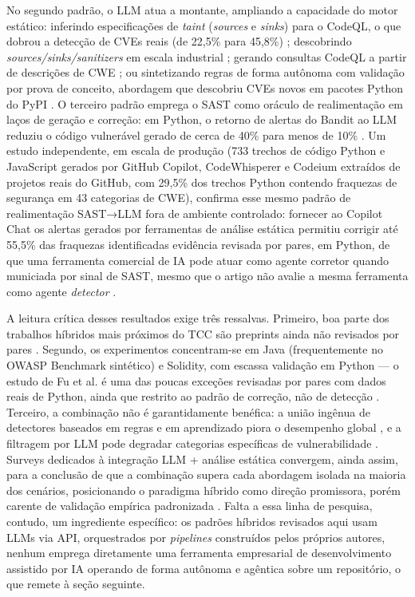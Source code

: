No segundo padrão, o LLM atua a montante, ampliando a capacidade do motor estático: inferindo especificações de \textit{taint} (\textit{sources} e \textit{sinks}) para o CodeQL, o que dobrou a detecção de CVEs reais (de 22,5\% para 45,8\%) \cite{Li2025IRIS}; descobrindo \textit{sources/sinks/sanitizers} em escala industrial \cite{Luo2025SASTLLMDFA}; gerando consultas CodeQL a partir de descrições de CWE \cite{Wang2026CQLLM}; ou sintetizando regras de forma autônoma com validação por prova de conceito, abordagem que descobriu CVEs novos em pacotes Python do PyPI \cite{Tsigkourakos2026QRS}. O terceiro padrão emprega o SAST como oráculo de realimentação em laços de geração e correção: em Python, o retorno de alertas do Bandit ao LLM reduziu o código vulnerável gerado de cerca de 40\% para menos de 10\% \cite{Alrashedy2025FDSP, Lee2026CodeEnhancer}. Um estudo independente, em escala de produção (733 trechos de código Python e JavaScript gerados por GitHub Copilot, CodeWhisperer e Codeium extraídos de projetos reais do GitHub, com 29,5\% dos trechos Python contendo fraquezas de segurança em 43 categorias de CWE), confirma esse mesmo padrão de realimentação SAST→LLM fora de ambiente controlado: fornecer ao Copilot Chat os alertas gerados por ferramentas de análise estática permitiu corrigir até 55,5\% das fraquezas identificadas evidência revisada por pares, em Python, de que uma ferramenta comercial de IA pode atuar como agente corretor quando municiada por sinal de SAST, mesmo que o artigo não avalie a mesma ferramenta como agente \textit{detector} \cite{Fu2025CopilotSecurity}.

A leitura crítica desses resultados exige três ressalvas. Primeiro, boa parte dos trabalhos híbridos mais próximos do TCC são preprints ainda não revisados por pares \cite{Ameen2026QASecClaw, Iranmanesh2025ZeroFalse, Agrawal2025SASTGenius, Tsigkourakos2026QRS}. Segundo, os experimentos concentram-se em Java (frequentemente no OWASP Benchmark sintético) e Solidity, com escassa validação em Python \cite{Ciavatta2026LLMSAST, Ameen2026QASecClaw, Li2025SASTReportsLLM} — o estudo de Fu et al. é uma das poucas exceções revisadas por pares com dados reais de Python, ainda que restrito ao padrão de correção, não de detecção \cite{Fu2025CopilotSecurity}. Terceiro, a combinação não é garantidamente benéfica: a união ingênua de detectores baseados em regras e em aprendizado piora o desempenho global \cite{Croft2021RuleLearningSAST}, e a filtragem por LLM pode degradar categorias específicas de vulnerabilidade \cite{Ciavatta2026LLMSAST, Ameen2026QASecClaw}. Surveys dedicados à integração LLM + análise estática convergem, ainda assim, para a conclusão de que a combinação supera cada abordagem isolada na maioria dos cenários, posicionando o paradigma híbrido como direção promissora, porém carente de validação empírica padronizada \cite{Jin2025LLMSASTSurvey, Khare2025LLMEffectiveness}. Falta a essa linha de pesquisa, contudo, um ingrediente específico: os padrões híbridos revisados aqui usam LLMs via API, orquestrados por \textit{pipelines} construídos pelos próprios autores, nenhum emprega diretamente uma ferramenta empresarial de desenvolvimento assistido por IA operando de forma autônoma e agêntica sobre um repositório, o que remete à seção seguinte.


